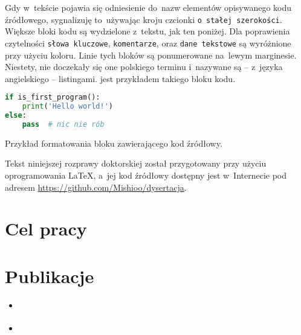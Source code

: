 Gdy w~tekście pojawia się odniesienie do~nazw elementów opisywanego kodu źródłowego,
  sygnalizuję to~używając kroju czcionki \lstinline!o stałej szerokości!.
Większe bloki kodu są wydzielone z~tekstu, jak ten poniżej.
Dla poprawienia czytelności 
  \lstinline[basicstyle=\ttfamily\color{wongvermillion},columns=fixed]!słowa kluczowe!,
  \lstinline[basicstyle=\ttfamily\color{wongsky},columns=fixed]!komentarze!, oraz 
  \lstinline[basicstyle=\ttfamily\color{wonggreen},columns=fixed]!dane tekstowe!
  są wyróżnione przy użyciu koloru.
Linie tych bloków są ponumerowane na~lewym marginesie.
Niestety, nie doczekały się one polskiego terminu i~nazywane są \--- 
  z~języka angielskiego \--- listingami.
 jest przykładem takiego bloku kodu.

\begin{listing}
\begin{lstlisting}[language=Python]
if is_first_program():
    print('Hello world!')
else:
    pass  # nic nie rób
\end{lstlisting}
\caption{Przykład formatowania bloku zawierającego kod źródłowy.}
\label{lst:example}
\end{listing}

Tekst niniejszej rozprawy doktorskiej został przygotowany przy użyciu oprogramowania \LaTeX,
  a~jej kod źródłowy dostępny jest w~Internecie pod adresem
  \url{https://github.com/Mishioo/dysertacja}.

\section{Cel pracy}\label{intro:goal}

\section{Publikacje}\label{intro:publications}
\begin{itemize}
  \item \cite{wieclaw21}
  \item \cite{stecko18}
\end{itemize}

